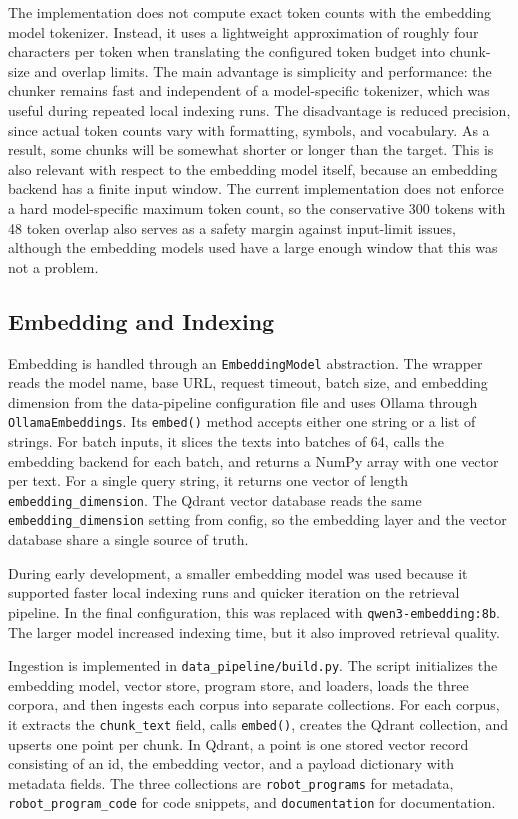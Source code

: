 The implementation does not compute exact token counts with the embedding model tokenizer. Instead, it uses a lightweight approximation of roughly four characters per token when translating the configured token budget into chunk-size and overlap limits. The main advantage is simplicity and performance: the chunker remains fast and independent of a model-specific tokenizer, which was useful during repeated local indexing runs. The disadvantage is reduced precision, since actual token counts vary with formatting, symbols, and vocabulary. As a result, some chunks will be somewhat shorter or longer than the target. This is also relevant with respect to the embedding model itself, because an embedding backend has a finite input window. The current implementation does not enforce a hard model-specific maximum token count, so the conservative 300 tokens with 48 token overlap also serves as a safety margin against input-limit issues, although the embedding models used have a large enough window that this was not a problem.

\subsection{Embedding and Indexing}
Embedding is handled through an \texttt{EmbeddingModel} abstraction. The wrapper reads the model name, base URL, request timeout, batch size, and embedding dimension from the data-pipeline configuration file and uses Ollama through \texttt{OllamaEmbeddings}. Its \texttt{embed()} method accepts either one string or a list of strings. For batch inputs, it slices the texts into batches of 64, calls the embedding backend for each batch, and returns a NumPy array with one vector per text. For a single query string, it returns one vector of length \texttt{embedding\_dimension}. The Qdrant vector database reads the same \texttt{embedding\_dimension} setting from config, so the embedding layer and the vector database share a single source of truth.

During early development, a smaller embedding model was used because it supported faster local indexing runs and quicker iteration on the retrieval pipeline. In the final configuration, this was replaced with \texttt{qwen3-embedding:8b}. The larger model increased indexing time, but it also improved retrieval quality.

Ingestion is implemented in \texttt{data\_pipeline/build.py}. The script initializes the embedding model, vector store, program store, and loaders, loads the three corpora, and then ingests each corpus into separate collections. For each corpus, it extracts the \texttt{chunk\_text} field, calls \texttt{embed()}, creates the Qdrant collection, and upserts one point per chunk. In Qdrant, a point is one stored vector record consisting of an id, the embedding vector, and a payload dictionary with metadata fields. The three collections are \texttt{robot\_programs} for metadata, \texttt{robot\_program\_code} for code snippets, and \texttt{documentation} for documentation.

